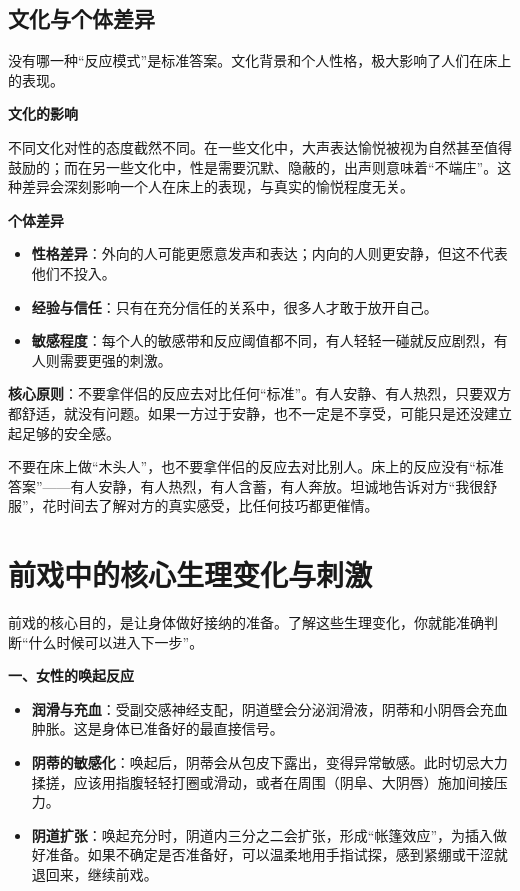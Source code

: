 \documentclass[12pt,UTF8]{ctexbook}
\begin{document}
\subsection{文化与个体差异}

没有哪一种“反应模式”是标准答案。文化背景和个人性格，极大影响了人们在床上的表现。

\textbf{文化的影响}

不同文化对性的态度截然不同。在一些文化中，大声表达愉悦被视为自然甚至值得鼓励的；而在另一些文化中，性是需要沉默、隐蔽的，出声则意味着“不端庄”。这种差异会深刻影响一个人在床上的表现，与真实的愉悦程度无关。

\textbf{个体差异}

\begin{itemize}
\item \textbf{性格差异}：外向的人可能更愿意发声和表达；内向的人则更安静，但这不代表他们不投入。
\item \textbf{经验与信任}：只有在充分信任的关系中，很多人才敢于放开自己。
\item \textbf{敏感程度}：每个人的敏感带和反应阈值都不同，有人轻轻一碰就反应剧烈，有人则需要更强的刺激。
\end{itemize}

\textbf{核心原则}：不要拿伴侣的反应去对比任何“标准”。有人安静、有人热烈，只要双方都舒适，就没有问题。如果一方过于安静，也不一定是不享受，可能只是还没建立起足够的安全感。

\begin{tcolorbox}[colback=pink!5!white,colframe=red!50!black,title=贴心小叮咛]
不要在床上做“木头人”，也不要拿伴侣的反应去对比别人。床上的反应没有“标准答案”——有人安静，有人热烈，有人含蓄，有人奔放。坦诚地告诉对方“我很舒服”，花时间去了解对方的真实感受，比任何技巧都更催情。
\end{tcolorbox}

\section{前戏中的核心生理变化与刺激}

前戏的核心目的，是让身体做好接纳的准备。了解这些生理变化，你就能准确判断“什么时候可以进入下一步”。

\textbf{一、女性的唤起反应}

\begin{itemize}
\item \textbf{润滑与充血}：受副交感神经支配，阴道壁会分泌润滑液，阴蒂和小阴唇会充血肿胀。这是身体已准备好的最直接信号。
\item \textbf{阴蒂的敏感化}：唤起后，阴蒂会从包皮下露出，变得异常敏感。此时切忌大力揉搓，应该用指腹轻轻打圈或滑动，或者在周围（阴阜、大阴唇）施加间接压力。
\item \textbf{阴道扩张}：唤起充分时，阴道内三分之二会扩张，形成“帐篷效应”，为插入做好准备。如果不确定是否准备好，可以温柔地用手指试探，感到紧绷或干涩就退回来，继续前戏。
\end{itemize}
\end{document}
